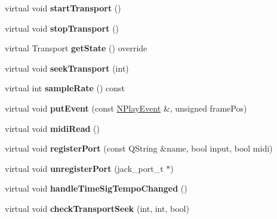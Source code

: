 \begin{DoxyCompactItemize}
virtual void {\bfseries start\+Transport} ()
\item 
\mbox{\label{class_ms_1_1_jack_audio_a9e7d86efe0187b1045a1e30a3eefcf97}} 
virtual void {\bfseries stop\+Transport} ()
\item 
\mbox{\label{class_ms_1_1_jack_audio_a1c74e2e57c4a40f563ee32d5c45dea3c}} 
virtual Transport {\bfseries get\+State} () override
\item 
\mbox{\label{class_ms_1_1_jack_audio_a699987ea79a82dda3eadb8346bafba8c}} 
virtual void {\bfseries seek\+Transport} (int)
\item 
\mbox{\label{class_ms_1_1_jack_audio_a0d416a03c1e9a1879ce50b72bbed6ee8}} 
virtual int {\bfseries sample\+Rate} () const
\item 
\mbox{\label{class_ms_1_1_jack_audio_a0199da817066ace78e8375138e88be0c}} 
virtual void {\bfseries put\+Event} (const \hyperlink{class_ms_1_1_n_play_event}{N\+Play\+Event} \&, unsigned frame\+Pos)
\item 
\mbox{\label{class_ms_1_1_jack_audio_ab67a48a0e6911aec803ceef934e41b78}} 
virtual void {\bfseries midi\+Read} ()
\item 
\mbox{\label{class_ms_1_1_jack_audio_a365123b1eba652a7ac9cd507a76d7619}} 
virtual void {\bfseries register\+Port} (const Q\+String \&name, bool input, bool midi)
\item 
\mbox{\label{class_ms_1_1_jack_audio_aaa948f11d89b7852c6d91cb10e9b207e}} 
virtual void {\bfseries unregister\+Port} (jack\+\_\+port\+\_\+t $\ast$)
\item 
\mbox{\label{class_ms_1_1_jack_audio_a899fb3aaf42296210e72d422d24b8002}} 
virtual void {\bfseries handle\+Time\+Sig\+Tempo\+Changed} ()
\item 
\mbox{\label{class_ms_1_1_jack_audio_a24548e679fd3c52be01540ee11221083}} 
virtual void {\bfseries check\+Transport\+Seek} (int, int, bool)

\end{DoxyCompactItemize}
